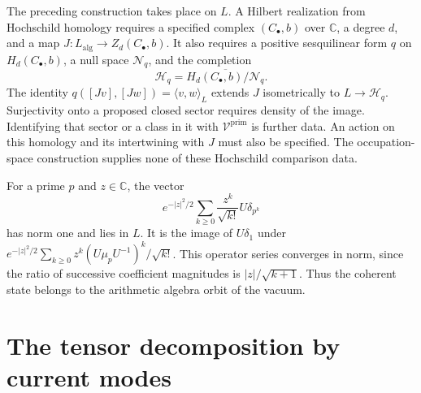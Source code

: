 \begin{remark}
\label{v4-arith:obs:zero-mode-action-maximal}
The preceding construction takes place on $L$.
A Hilbert realization from Hochschild homology requires a specified
complex $(C_\bullet,b)$ over $\mathbb C$, a degree $d$, and a map
$J:L_{\mathrm{alg}}\to Z_d(C_\bullet,b)$.
It also requires a positive sesquilinear form $q$ on
$H_d(C_\bullet,b)$, a null space $\mathcal N_q$, and the completion
\[
 \mathcal H_q=\overline{H_d(C_\bullet,b)/\mathcal N_q}.
\]
The identity
$q([Jv],[Jw])=\langle v,w\rangle_L$ extends $J$ isometrically
to $L\to\mathcal H_q$.
Surjectivity onto a proposed closed sector requires density of the image.
Identifying that sector or a class in it with
$\mathcal V^{\mathrm{prim}}$ is further data.
An action on this homology and its intertwining with $J$ must also
be specified. The occupation-space construction supplies none of
these Hochschild comparison data.
\end{remark}

\begin{example}
For a prime $p$ and $z\in\mathbb C$, the vector
\[
 e^{-|z|^2/2}\sum_{k\geq0}\frac{z^k}{\sqrt{k!}}U\delta_{p^k}
\]
has norm one and lies in $L$.
It is the image of $U\delta_1$ under
$e^{-|z|^2/2}\sum_{k\geq0}z^k(U\mu_pU^{-1})^k/\sqrt{k!}$.
This operator series converges in norm, since the ratio of successive
coefficient magnitudes is $|z|/\sqrt{k+1}$.
Thus the coherent state belongs to the arithmetic algebra orbit
of the vacuum.
\end{example}

\section{The tensor decomposition by current modes}
\label{v4-arith:cs:tensor-decomposition}

